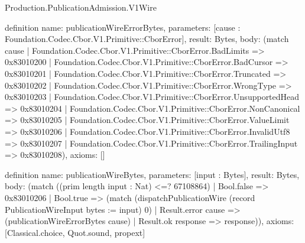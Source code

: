 \begin{lexlean}{Production.PublicationAdmission.V1Wire}
\begin{semanticmodule}
definition{
  name: publicationWireErrorBytes,
  parameters: [cause : Foundation.Codec.Cbor.V1.Primitive::CborError],
  result: Bytes,
  body: (match cause
    | Foundation.Codec.Cbor.V1.Primitive::CborError.BadLimits => 0x83010200
    | Foundation.Codec.Cbor.V1.Primitive::CborError.BadCursor => 0x83010201
    | Foundation.Codec.Cbor.V1.Primitive::CborError.Truncated => 0x83010202
    | Foundation.Codec.Cbor.V1.Primitive::CborError.WrongType => 0x83010203
    | Foundation.Codec.Cbor.V1.Primitive::CborError.UnsupportedHead => 0x83010204
    | Foundation.Codec.Cbor.V1.Primitive::CborError.NonCanonical => 0x83010205
    | Foundation.Codec.Cbor.V1.Primitive::CborError.ValueLimit => 0x83010206
    | Foundation.Codec.Cbor.V1.Primitive::CborError.InvalidUtf8 => 0x83010207
    | Foundation.Codec.Cbor.V1.Primitive::CborError.TrailingInput => 0x83010208),
  axioms: []
}

definition{
  name: publicationWireBytes,
  parameters: [input : Bytes],
  result: Bytes,
  body: (match ((prim length input : Nat) <=? 67108864)
    | Bool.false => 0x83010206
    | Bool.true => (match (dispatchPublicationWire (record PublicationWireInput {bytes := input}) 0)
      | Result.error cause => (publicationWireErrorBytes cause)
      | Result.ok response => response)),
  axioms: [Classical.choice, Quot.sound, propext]
}
\end{semanticmodule}
\end{lexlean}
